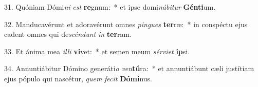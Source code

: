 31. Quóniam Dómi\textit{ni} \textit{est} \textbf{re}gnum:~*  et ipse domi\textit{ná}\textit{bi}\textit{tur} \textbf{Gén}\textbf{ti}um.\

32. Manducavérunt et adoravérunt omnes \textit{pin}\textit{gues} \textbf{ter}ræ:~*  in conspéctu ejus cadent omnes qui de\textit{scén}\textit{dunt} \textit{in} \textbf{ter}ram.\

33. Et ánima mea \textit{il}\textit{li} \textbf{vi}vet:~*  et semen meum \textit{sér}\textit{vi}\textit{et} \textbf{ip}si.\

34. Annuntiábitur Dómino generáti\textit{o} \textit{ven}\textbf{tú}ra:~*  et annuntiábunt cæli justítiam ejus pópulo qui nascétur, \textit{quem} \textit{fe}\textit{cit} \textbf{Dó}\textbf{mi}nus.\


